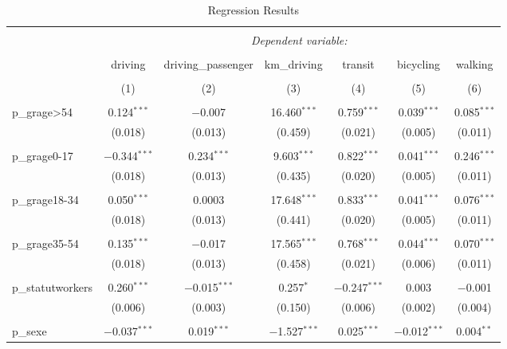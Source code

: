 
\begin{table}[!htbp] \centering 
  \caption{Regression Results} 
  \label{} 
\begin{tabular}{@{\extracolsep{5pt}}lcccccc} 
\\[-1.8ex]\hline 
\hline \\[-1.8ex] 
 & \multicolumn{6}{c}{\textit{Dependent variable:}} \\ 
\cline{2-7} 
\\[-1.8ex] & driving & driving_passenger & km_driving & transit & bicycling & walking \\ 
\\[-1.8ex] & (1) & (2) & (3) & (4) & (5) & (6)\\ 
\hline \\[-1.8ex] 
 p\_grage\textgreater 54 & 0.124$^{***}$ & $-$0.007 & 16.460$^{***}$ & 0.759$^{***}$ & 0.039$^{***}$ & 0.085$^{***}$ \\ 
  & (0.018) & (0.013) & (0.459) & (0.021) & (0.005) & (0.011) \\ 
  & & & & & & \\ 
 p\_grage0-17 & $-$0.344$^{***}$ & 0.234$^{***}$ & 9.603$^{***}$ & 0.822$^{***}$ & 0.041$^{***}$ & 0.246$^{***}$ \\ 
  & (0.018) & (0.013) & (0.435) & (0.020) & (0.005) & (0.011) \\ 
  & & & & & & \\ 
 p\_grage18-34 & 0.050$^{***}$ & 0.0003 & 17.648$^{***}$ & 0.833$^{***}$ & 0.041$^{***}$ & 0.076$^{***}$ \\ 
  & (0.018) & (0.013) & (0.441) & (0.020) & (0.005) & (0.011) \\ 
  & & & & & & \\ 
 p\_grage35-54 & 0.135$^{***}$ & $-$0.017 & 17.565$^{***}$ & 0.768$^{***}$ & 0.044$^{***}$ & 0.070$^{***}$ \\ 
  & (0.018) & (0.013) & (0.458) & (0.021) & (0.006) & (0.011) \\ 
  & & & & & & \\ 
 p\_statutworkers & 0.260$^{***}$ & $-$0.015$^{***}$ & 0.257$^{*}$ & $-$0.247$^{***}$ & 0.003 & $-$0.001 \\ 
  & (0.006) & (0.003) & (0.150) & (0.006) & (0.002) & (0.004) \\ 
  & & & & & & \\ 
 p\_sexe & $-$0.037$^{***}$ & 0.019$^{***}$ & $-$1.527$^{***}$ & 0.025$^{***}$ & $-$0.012$^{***}$ & 0.004$^{**}$ \\ 

\end{tabular}
\end{table}
